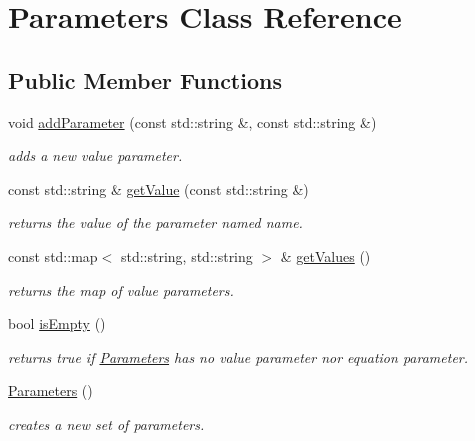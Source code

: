 \hypertarget{class_open_chams_1_1_parameters}{}\section{Parameters Class Reference}
\label{class_open_chams_1_1_parameters}
\subsection*{Public Member Functions}
\begin{DoxyCompactItemize}
\item 
void \mbox{\hyperlink{class_open_chams_1_1_parameters_a9ad9a7acc15a142788270ccd255b5e91}{add\+Parameter}} (const std\+::string \&, const std\+::string \&)
\begin{DoxyCompactList}\small\item\em adds a new value parameter. \end{DoxyCompactList}\item 
const std\+::string \& \mbox{\hyperlink{class_open_chams_1_1_parameters_a41b343d6037f531fd92912b453b40f2b}{get\+Value}} (const std\+::string \&)
\begin{DoxyCompactList}\small\item\em returns the value of the parameter named {\ttfamily name}. \end{DoxyCompactList}\item 
\mbox{\label{class_open_chams_1_1_parameters_a0f890d16c3b2a0bcbdf060854ea07877}} 
const std\+::map$<$ std\+::string, std\+::string $>$ \& \mbox{\hyperlink{class_open_chams_1_1_parameters_a0f890d16c3b2a0bcbdf060854ea07877}{get\+Values}} ()
\begin{DoxyCompactList}\small\item\em returns the map of value parameters. \end{DoxyCompactList}\item 
\mbox{\label{class_open_chams_1_1_parameters_af337ffd75e4f019ce15302c60715d84b}} 
bool \mbox{\hyperlink{class_open_chams_1_1_parameters_af337ffd75e4f019ce15302c60715d84b}{is\+Empty}} ()
\begin{DoxyCompactList}\small\item\em returns true if \mbox{\hyperlink{class_open_chams_1_1_parameters}{Parameters}} has no value parameter nor equation parameter. \end{DoxyCompactList}\item 
\mbox{\label{class_open_chams_1_1_parameters_a061bbedbf4fbd963871a388f5e8ebb61}} 
\mbox{\hyperlink{class_open_chams_1_1_parameters_a061bbedbf4fbd963871a388f5e8ebb61}{Parameters}} ()
\begin{DoxyCompactList}\small\item\em creates a new set of parameters. \end{DoxyCompactList}\end{DoxyCompactItemize}


